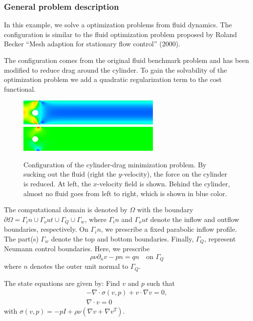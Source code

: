 \subsubsection{General problem description}
In this example, we solve a optimization problems from 
fluid dynamics. The configuration is similar to 
the fluid optimization problem proposed by Roland Becker 
``Mesh adaption for stationary flow control'' (2000).

The configuration
    comes from the original fluid benchmark problem
    and has been modified to reduce drag around the
    cylinder. To gain the solvability of
    the optimization problem we add a quadratic
    regularization term to the cost functional.


\begin{figure}[h]
\centering
    {\includegraphics[width=7cm]{Documentation/visit_Nov_15_2013_0000_a.png}}
    {\includegraphics[width=7cm]{Documentation/visit_Nov_15_2013_0001_a.png}}
  \caption{Configuration of the cylinder-drag minimization problem. 
By sucking out the fluid (right the $y$-velocity), 
the force on the cylinder is reduced. At left, the $x$-velocity field 
is shown. Behind the cylinder, almost no fluid goes from left to right, 
which is shown in blue color.}
  \label{ex_2_plots}
\end{figure}

The computational domain is denoted by $\Omega$ with the 
boundary $\partial\Omega
= \Gamma_in \cup \Gamma_out \cup \Gamma_Q \cup \Gamma_w$, 
where $\Gamma_in$ and $\Gamma_out$ denote the inflow and outflow
boundaries, respectively. On $\Gamma_in$, we prescribe a fixed parabolic 
inflow profile. The part(s) $\Gamma_w$ denote the top and bottom 
boundaries. Finally, $\Gamma_Q$, represent Neumann control boundaries. Here,
we prescribe 
\[
\rho\nu \partial_n v - pn = qn \quad\text{on } \Gamma_Q
\] 
where $n$ denotes the outer unit normal to $\Gamma_Q$. 

The state equations are given by: Find $v$ and $p$ such that
\begin{align*}
- \nabla\cdot \sigma(v,p) + v\cdot \nabla v = 0,\\
\nabla\cdot v = 0
\end{align*}
with $\sigma(v,p) = -pI + \rho\nu(\nabla v + \nabla v^T)$.

